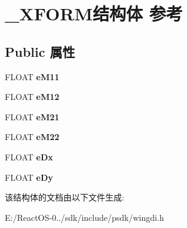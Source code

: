 \hypertarget{struct___x_f_o_r_m}{}\section{\+\_\+\+X\+F\+O\+R\+M结构体 参考}
\label{struct___x_f_o_r_m}
\subsection*{Public 属性}
\begin{DoxyCompactItemize}
\item 
\mbox{\label{struct___x_f_o_r_m_a1b3a3a3928ec803f8124896b7e914ef4}} 
F\+L\+O\+AT {\bfseries e\+M11}
\item 
\mbox{\label{struct___x_f_o_r_m_aa739075c1599f6ea09579f9b71fb1404}} 
F\+L\+O\+AT {\bfseries e\+M12}
\item 
\mbox{\label{struct___x_f_o_r_m_a84edc86e7d19cdc9492663478e5e72d8}} 
F\+L\+O\+AT {\bfseries e\+M21}
\item 
\mbox{\label{struct___x_f_o_r_m_aa3de57061b0c78b6ded3317d1fa4fbba}} 
F\+L\+O\+AT {\bfseries e\+M22}
\item 
\mbox{\label{struct___x_f_o_r_m_ab807aa58029a6383be36a353650ee8be}} 
F\+L\+O\+AT {\bfseries e\+Dx}
\item 
\mbox{\label{struct___x_f_o_r_m_a1a2a050e9c209a77650666f39d5ac655}} 
F\+L\+O\+AT {\bfseries e\+Dy}
\end{DoxyCompactItemize}


该结构体的文档由以下文件生成\+:\begin{DoxyCompactItemize}
\item 
E\+:/\+React\+O\+S-\/0../sdk/include/psdk/wingdi.\+h\end{DoxyCompactItemize}
